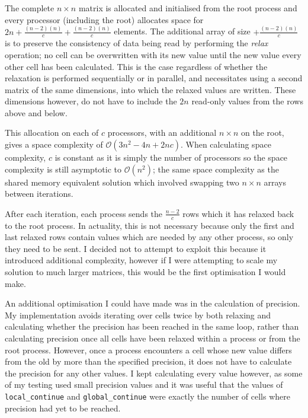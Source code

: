 \documentclass[12pt]{article}
\begin{document}
The complete $n\times{n}$ matrix is allocated and initialised from the root process and every processor (including the root) allocates space for $2n+\frac{(n-2)(n)}{c} +\frac{(n-2)(n)}{c}$ elements. The additional array of size $+\frac{(n-2)(n)}{c}$ is to preserve the consistency of data being read by performing the \textit{relax} operation; no cell can be overwritten with its new value until the new value every other cell has been calculated. This is the case regardless of whether the relaxation is performed sequentially or in parallel, and necessitates using a second matrix of the same dimensions, into which the relaxed values are written. These dimensions however, do not have to include the $2n$ read-only values from the rows above and below.

This allocation on each of $c$ processors, with an additional $n\times{n}$ on the root, gives a space complexity of $\mathcal{O}(3n^2 -4n + 2nc)$. When calculating space complexity, $c$ is constant as it is simply the number of processors so the space complexity is still asymptotic to $\mathcal{O}(n^2)$; the same space complexity as the shared memory equivalent solution which involved swapping two $n\times{n}$ arrays between iterations.

After each iteration, each process sends the $\frac{n-2}{c}$ rows which it has relaxed back to the root process. In actuality, this is not necessary because only the first and last relaxed rows contain values which are needed by any other process, so only they need to be sent. I decided not to attempt to exploit this because it introduced additional complexity, however if I were attempting to scale my solution to much larger matrices, this would be the first optimisation I would make.

An additional optimisation I could have made was in the calculation of precision. My implementation avoids iterating over cells twice by both relaxing and calculating whether the precision has been reached in the same loop, rather than calculating precision once all cells have been relaxed within a process or from the root process. However, once a process encounters a cell whose new value differs from the old by more than the specified precision, it does not have to calculate the precision for any other values. I kept calculating every value however, as some of my testing used small precision values and it was useful that the values of \texttt{local\_continue} and \texttt{global\_continue} were exactly the number of cells where precision had yet to be reached.
\end{document}
